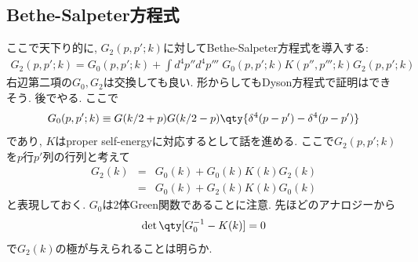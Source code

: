 \documentclass[10.5pt,a4paper]{jreport}
\begin{document}
\subsection{Bethe-Salpeter方程式}
ここで天下り的に, $G_2(p, p';k)$に対してBethe-Salpeter方程式を導入する:
\begin{eqnarray}
  G_2(p, p';k) = G_0(p, p';k) + \int d^4p''d^4p'''\;G_0(p, p';k)K(p'', p''';k)G_2(p, p';k)
\end{eqnarray}
右辺第二項の$G_0, G_2$は交換しても良い. 形からしてもDyson方程式で証明はできそう. 後でやる. ここで
\begin{eqnarray}
  G_0(p, p';k) \equiv G(k/2+p)G(k/2-p)\qty{\delta^4(p-p') - \delta^4(p-p')}
\end{eqnarray}
であり, $K$はproper self-energyに対応するとして話を進める. ここで$G_2(p, p';k)$を$p$行$p'$列の行列と考えて
\begin{eqnarray}
  G_2(k) &=& G_0(k) + G_0(k)K(k)G_2(k)\\
  &=& G_0(k) + G_2(k)K(k)G_0(k)  
\end{eqnarray}
と表現しておく. $G_0$は2体Green関数であることに注意. 先ほどのアナロジーから
\begin{eqnarray}
  \det\qty[G_0^{-1} - K(k)] = 0
\end{eqnarray}
で$G_2(k)$の極が与えられることは明らか.

\end{document}
